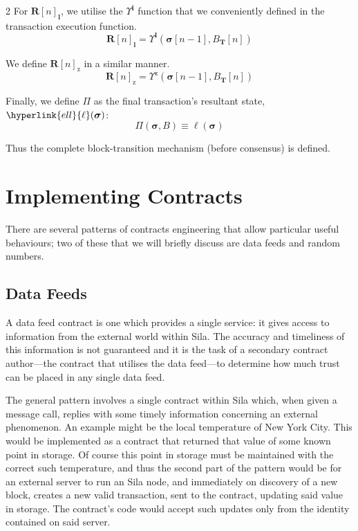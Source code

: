 \documentclass[9pt,oneside]{amsart}
\begin{document}
\begin{multicols}{2}
For $\mathbf{R}[n]_{\mathbf{l}}$, we utilise the \hyperlink{Upsilon_pow_l}{$\Upsilon^\mathbf{l}$} function that we conveniently defined in the transaction execution function.
\begin{equation}
\mathbf{R}[n]_{\mathbf{l}} =
\Upsilon^{\mathbf{l}}(\boldsymbol{\sigma}[n - 1], B_{\mathbf{T}}[n])
\end{equation}

We define \hyperlink{Upsilon_pow_z}{$\mathbf{R}[n]_{\mathrm{z}}$} in a similar manner.
\begin{equation}
\mathbf{R}[n]_{\mathrm{z}} =
\Upsilon^{\mathrm{z}}(\boldsymbol{\sigma}[n - 1], B_{\mathbf{T}}[n])
\end{equation}

\hypertarget{Pi}{}Finally, we define $\Pi$ as the final transaction's resultant state, $\hyperlink{ell}{\ell}(\boldsymbol{\sigma})$:
\begin{equation}
\Pi(\boldsymbol{\sigma}, B) \equiv \ell(\boldsymbol{\sigma})
\end{equation}

Thus the complete block-transition mechanism (before consensus) is defined.

\section{Implementing Contracts}

There are several patterns of contracts engineering that allow particular useful behaviours; two of these that we will briefly discuss are data feeds and random numbers.

\subsection{Data Feeds}
A data feed contract is one which provides a single service: it gives access to information from the external world within Sila. The accuracy and timeliness of this information is not guaranteed and it is the task of a secondary contract author---the contract that utilises the data feed---to determine how much trust can be placed in any single data feed.

The general pattern involves a single contract within Sila which, when given a message call, replies with some timely information concerning an external phenomenon. An example might be the local temperature of New York City. This would be implemented as a contract that returned that value of some known point in storage. Of course this point in storage must be maintained with the correct such temperature, and thus the second part of the pattern would be for an external server to run an Sila node, and immediately on discovery of a new block, creates a new valid transaction, sent to the contract, updating said value in storage. The contract's code would accept such updates only from the identity contained on said server.


\end{multicols}
\end{document}
